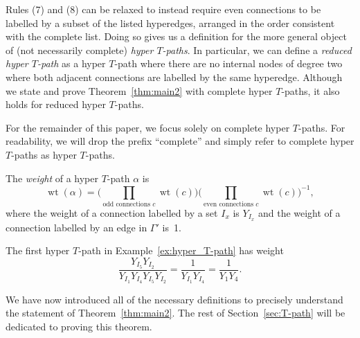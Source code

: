 \documentclass[pdftex]{sigma}
\numberwithin{equation}{section}
\DeclareMathOperator{\wt}{wt}
\begin{document}
\begin{Remark}
 Rules (7) and (8) can be relaxed to instead require even connections to be labelled by a subset of the listed hyperedges, arranged in the order consistent with the complete list. Doing so gives us a definition for the more general object of (not necessarily complete) \emph{hyper $T$-paths}. In particular, we can define a \emph{reduced hyper $T$-path} as a hyper $T$-path where there are no internal nodes of degree two where both adjacent connections are labelled by the same hyperedge. Although we state and prove Theorem~\ref{thm:main2} with complete hyper $T$-paths, it also holds for reduced hyper $T$-paths.
\end{Remark}
For the remainder of this paper, we focus solely on complete hyper $T$-paths. For readability, we will drop the prefix ``complete'' and simply refer to complete hyper $T$-paths as hyper $T$-paths.
\begin{Definition}
The \emph{weight} of a hyper $T$-path $\alpha$ is \[ \wt(\alpha)=\bigg(\prod_{\text{odd connections }c} \wt(c)\bigg)\bigg(\prod_{\text{even connections }c} \wt(c)\bigg)^{-1},\]
where the weight of a connection labelled by a set $I_x$ is $Y_{I_x}$ and the weight of a connection labelled by an edge in $\Gamma'$ is~1.
\end{Definition}
\begin{Example}
The first hyper $T$-path in Example~\ref{ex:hyper_T-path} has weight \[\frac{Y_{I_5}Y_{I_2}}{Y_{I_1}Y_{I_4}Y_{I_5}Y_{I_2}}=\frac{1}{Y_{I_1}Y_{I_4}}=\frac{1}{Y_1Y_4}.\]
\end{Example}
We have now introduced all of the necessary definitions to precisely understand the statement of Theorem~\ref{thm:main2}. The rest of Section~\ref{sec:T-path} will be dedicated to proving this theorem.
\end{document}
